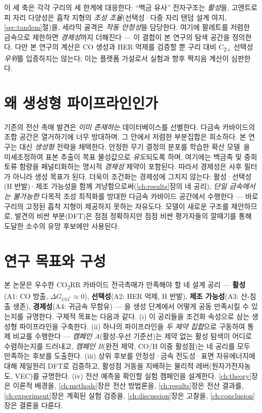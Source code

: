 \documentclass[11pt,a4paper]{report}
\newcommand{\dGCO}{\Delta G_{\mathrm{CO^*}}}
\begin{document}
이 세 축은 각각 구리의 세 한계에 대응한다: ``백금 유사'' 전자구조는 \emph{활성}을, 고엔트로피 자리
다양성은 흡착 지형의 \emph{조성 조율}(선택성·다중 자리 탠덤 설계 여지, \ref{sec:tandem}절)을, 세라믹
골격은 \emph{작동 안정성}을 담당한다. 여기에 팔레트를 저렴한 금속으로 제한하면 \emph{경제성}까지
더해진다 --- 이 결합이 본 연구의 탐색 공간을 정의한다. 다만 본 연구의 계산은 CO 생성과 HER 억제를
검증할 뿐 구리 대비 C\textsubscript{2+} 선택성 \emph{우위}를 입증하지는 않는다; 이는 플랫폼 가설로서
실험과 향후 짝지음 계산이 심판한다.

\section{왜 생성형 파이프라인인가}
기존의 전산 촉매 발견은 \emph{이미 존재하는} 데이터베이스를 선별한다. 다금속 카바이드의 조합
공간은 열거하기에 너무 방대하며, 그 안에서 저렴한 부분집합은 희소하다. 본 연구는 대신
\emph{생성형} 전략을 채택한다. 안정한 무기 결정의 분포를 학습한 확산 모델~\cite{zeni2025}을
미세조정하여 표본 추출이 목표 물성값으로 \emph{유도}되도록 하며, 여기에는 백금족 및 중희토류
함량을 페널티화하는 명시적 \emph{경제성} 제약이 포함된다. 따라서 경제성은 사후 필터가 아니라
생성 목표가 된다. 더욱이 조건화는 경제성에 그치지 않는다: 활성·선택성(H 반발)·제조 가능성을 함께
겨냥함으로써(\ref{ch:results}장의 네 공리), \emph{단일 금속에서는 불가능한} 다목적 조성 최적화를
방대한 다금속 카바이드 공간에서 수행한다 --- 바로 구리의 고정된 흡착 지형이 제공하지 못하는 자유도다.
모델이 새로운 구조를 제안하므로, 발견의 비싼 부분(DFT)은 점점 정확하지만 점점 비싼 평가자들의
깔때기를 통해 도달한 소수의 유망 후보에만 사용된다.

\section{연구 목표와 구성}
본 논문은 우수한 CO\textsubscript{2}RR 카바이드 전극촉매가 만족해야 할 네 설계 공리 ---
\textbf{활성}(A1: CO 방출, $\dGCO\!\approx\!0$), \textbf{선택성}(A2: HER 억제, H 반발), \textbf{제조
가능성}(A3: 산-침출 생존), \textbf{경제성}(A4: 귀금속 무함유) --- 을 생성 단계에서 어떻게
공동 만족시킬 수 있는지를 규명한다. 구체적 목표는 다음과 같다. (i) 이 공리들을 조건화 속성으로 삼는
생성형 파이프라인을 구축한다. (ii) 하나의 파이프라인을 \emph{두 제약 집합}으로 구동하여 통제 비교를
수행한다 --- \emph{캠페인 A}(활성-우선 기준선)는 제약 없는 활성 탐색이 어디로 수렴하는지를 드러내고,
\emph{캠페인 B}(완전 제약, CO/H 이중 활성점)는 네 공리를 모두 만족하는 후보를 도출한다. (iii) 상위
후보를 안정성·금속 전도성·표면 자유에너지에 대해 제일원리 DFT로 검증하고, 활성점 거동을 지배하는
물리적 레버(원자가전자농도, VEC)를 규명한다. (iv) 전산 예측을 확인할 실험 캠페인을 설계한다.
\ref{ch:theory}장은
이론적 배경을, \ref{ch:methods}장은 전산 방법론을, \ref{ch:results}장은 전산 결과를,
\ref{ch:experiment}장은 계획된 실험 검증을, \ref{ch:discussion}장은 고찰을, \ref{ch:conclusion}장은
결론을 다룬다.
\end{document}
